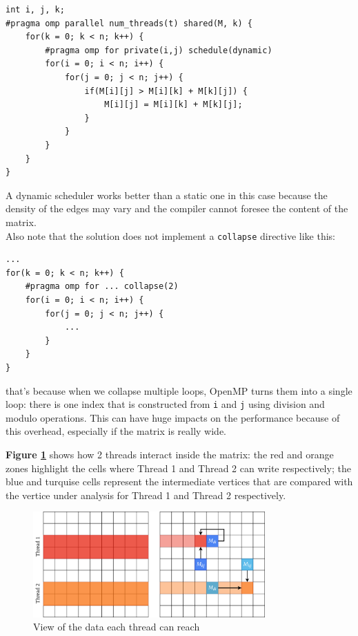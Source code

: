 \begin{lstlisting}[style=CStyle]
int i, j, k;
#pragma omp parallel num_threads(t) shared(M, k) {
	for(k = 0; k < n; k++) {
		#pragma omp for private(i,j) schedule(dynamic)			
		for(i = 0; i < n; i++) {
			for(j = 0; j < n; j++) {
				if(M[i][j] > M[i][k] + M[k][j]) {
					M[i][j] = M[i][k] + M[k][j];
				}
			}
		}
	}
}
\end{lstlisting}

A dynamic scheduler works better than a static one in this case because the
density of the edges may vary and the compiler cannot foresee the content of the matrix. \\
Also note that the solution does not implement a \texttt{collapse} directive like this:
\begin{lstlisting}[style=CStyle]
...
for(k = 0; k < n; k++) {
	#pragma omp for ... collapse(2)			
	for(i = 0; i < n; i++) {
		for(j = 0; j < n; j++) {
			...
		}
	}
}
\end{lstlisting}
that's because when we collapse multiple loops, OpenMP turns them into a single loop: there is one
index that is constructed from \texttt{i} and \texttt{j} using division and modulo operations. This can
have huge impacts on the performance because of this overhead, especially if the matrix is really wide.

\textbf{Figure \ref*{fig:threads}} shows how 2 threads interact inside the matrix: the red and orange zones highlight the cells where
Thread 1 and Thread 2 can write respectively; the blue and turquise cells represent the intermediate vertices that are compared
with the vertice under analysis for Thread 1 and Thread 2 respectively.

\begin{figure}[h!]
\centering                                                                        
\includegraphics[width=3.5in]{diagrams/openmp-threads}
\captionsetup{justification=centering,margin=2cm}                                                                                                                                   
\caption{View of the data each thread can reach}                                                                                                                                            
\label{fig:threads}                                                                                                                                                           
\end{figure}


